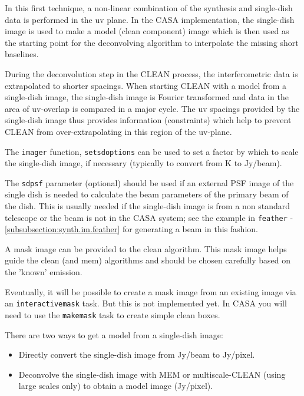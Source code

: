 \vspace{3mm}

In this first technique, a non-linear combination of the synthesis and
single-dish data is performed in the uv plane. In the CASA
implementation, the single-dish image is used to make a model (clean
component) image which is then used as the starting point for the
deconvolving algorithm to interpolate the missing short baselines.

During the deconvolution step in the CLEAN process, the
interferometric data is extrapolated to shorter spacings.  When
starting CLEAN with a model from a single-dish image, the single-dish
image is Fourier transformed and data in the area of uv-overlap is
compared in a major cycle.  The uv spacings provided by the
single-dish image thus provides information (constraints) which help
to prevent CLEAN from over-extrapolating in this region of the
uv-plane.

The {\tt imager} function, {\tt setsdoptions} can be used to set a
factor by which to scale the single-dish image, if necessary
(typically to convert from K to Jy/beam).

The {\tt sdpsf} parameter (optional) should be used if an external PSF
image of the single dish is needed to calculate the beam parameters of
the primary beam of the dish. This is usually needed if the
single-dish image is from a non standard telescope or the beam is not
in the CASA system; see the example in {\tt feather} -
\ref{subsubsection:synth.im.feather} for generating a beam in this fashion.

A mask image can be provided to the clean algorithm. This mask image
helps guide the clean (and mem) algorithms and should be chosen
carefully based on the 'known' emission.  

Eventually, it will be possible to create a mask image from an
existing image via an {\tt interactivemask} task.  But this is not
implemented yet.  In CASA you will need to use the {\tt makemask} task
to create simple clean boxes.

There are two ways to get a model from a single-dish image:

\begin{itemize}
\item Directly convert the single-dish image from Jy/beam to Jy/pixel.
\item Deconvolve the single-dish image with MEM or multiscale-CLEAN
      (using large scales only) to obtain a model image (Jy/pixel). 
\end{itemize}

